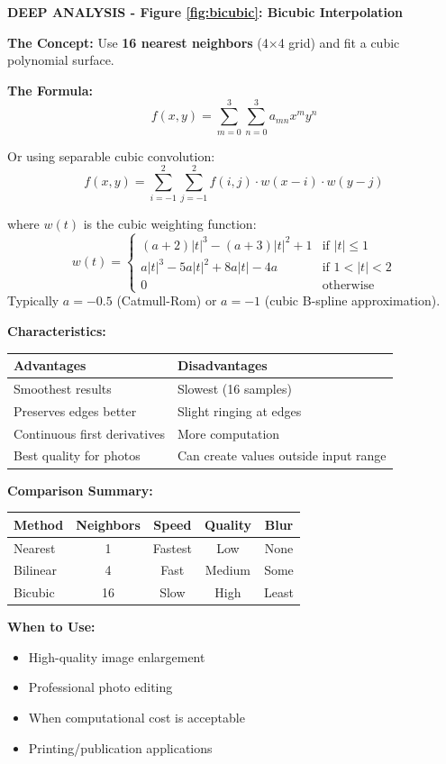 \documentclass[12pt,a4paper]{article}
\begin{document}
\begin{deepexplanation}
\textbf{DEEP ANALYSIS - Figure \ref{fig:bicubic}: Bicubic Interpolation}

\textbf{The Concept:}
Use \textbf{16 nearest neighbors} (4×4 grid) and fit a cubic polynomial surface.

\textbf{The Formula:}
\[
f(x, y) = \sum_{m=0}^{3} \sum_{n=0}^{3} a_{mn} x^m y^n
\]

Or using separable cubic convolution:
\[
f(x, y) = \sum_{i=-1}^{2} \sum_{j=-1}^{2} f(i, j) \cdot w(x-i) \cdot w(y-j)
\]

where $w(t)$ is the cubic weighting function:
\[
w(t) = \begin{cases}
(a+2)|t|^3 - (a+3)|t|^2 + 1 & \text{if } |t| \leq 1 \\
a|t|^3 - 5a|t|^2 + 8a|t| - 4a & \text{if } 1 < |t| < 2 \\
0 & \text{otherwise}
\end{cases}
\]
Typically $a = -0.5$ (Catmull-Rom) or $a = -1$ (cubic B-spline approximation).

\textbf{Characteristics:}
\begin{center}
\begin{tabular}{|l|l|}
\hline
\textbf{Advantages} & \textbf{Disadvantages} \\
\hline
Smoothest results & Slowest (16 samples) \\
Preserves edges better & Slight ringing at edges \\
Continuous first derivatives & More computation \\
Best quality for photos & Can create values outside input range \\
\hline
\end{tabular}
\end{center}

\textbf{Comparison Summary:}
\begin{center}
\begin{tabular}{|l|c|c|c|c|}
\hline
\textbf{Method} & \textbf{Neighbors} & \textbf{Speed} & \textbf{Quality} & \textbf{Blur} \\
\hline
Nearest & 1 & Fastest & Low & None \\
Bilinear & 4 & Fast & Medium & Some \\
Bicubic & 16 & Slow & High & Least \\
\hline
\end{tabular}
\end{center}

\textbf{When to Use:}
\begin{itemize}
    \item High-quality image enlargement
    \item Professional photo editing
    \item When computational cost is acceptable
    \item Printing/publication applications
\end{itemize}
\end{deepexplanation}
\end{document}
